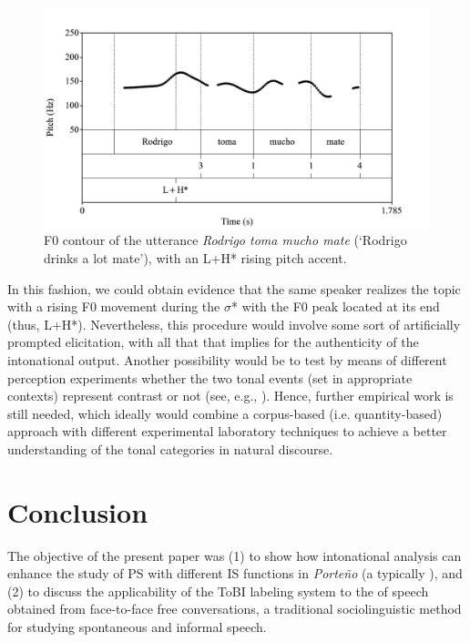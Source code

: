 \documentclass[output=paper]{langsci/langscibook}
\begin{document}
  

\begin{figure}
\includegraphics[width=\textwidth]{figures/pes-img21.png}
  \caption{F0 contour of the utterance \textit{Rodrigo toma mucho mate} (‘Rodrigo drinks a lot {mate’}), with an L+H* rising pitch accent.}
  \label{fig:pes:21}
\end{figure}

In this fashion, we could obtain evidence that the same speaker realizes the topic with a rising F0 movement during the $\sigma $* with the F0 peak located at its end (thus, L+H*). Nevertheless, this procedure would involve some sort of artificially prompted elicitation, with all that that implies for the authenticity of the intonational output. Another possibility would be to test by means of different perception experiments whether the two tonal events (set in appropriate contexts) represent contrast or not (see, e.g., \citealt{Vanrell2006,Feldhausen2011,BorrasComes.2014}). Hence, further empirical work is still needed, which ideally would combine a corpus-based (i.e. quantity-based) approach with different experimental laboratory techniques to achieve a better understanding of the tonal categories in natural discourse.


\section{Conclusion}
\label{sec:pes:5}
The objective of the present paper was
(1) to show how intonational analysis can enhance the study of PS with different IS functions in \textit{Porte{\~n}o}  (a typically ), and
(2) to discuss the applicability of the ToBI labeling system to the  of speech obtained from face-to-face free conversations, a traditional sociolinguistic method for studying spontaneous and informal speech.
\end{document}
